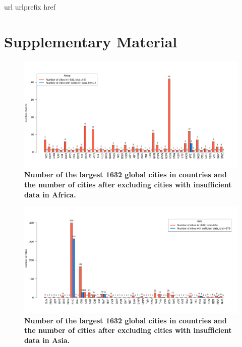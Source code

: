 \documentclass[preprint,12pt]{elsarticle}
\newcommand{\beginsupplement}{%
        \setcounter{table}{0}
        \renewcommand{\thetable}{S\arabic{table}}%
        \setcounter{figure}{0}
        \renewcommand{\thefigure}{S\arabic{figure}}%
     }
\begin{document}

 
%
\begin{thebibliography}{1}
\expandafter\ifx\csname url\endcsname\relax
  \def\url#1{\texttt{#1}}\fi
\expandafter\ifx\csname urlprefix\endcsname\relax\def\urlprefix{URL }\fi
\expandafter\ifx\csname href\endcsname\relax
  \def\href#1#2{#2} \def\path#1{#1}\fi

\end{thebibliography}


\section{Supplementary Material}
\beginsupplement

\begin{figure}
\centering
\includegraphics[trim={ 0 35 25 50 },clip,scale=0.45]{Images/Africa_cities.png}
\caption{\bf Number of the largest 1632 global cities in countries and the number of cities after excluding cities with insufficient data in Africa.}
 \label{fig:africa}
\end{figure}

\begin{figure}
\centering
\includegraphics[trim={ 0 35 25 50 },clip,scale=0.45]{Images/Asia_cities.png}
\caption{\bf Number of the largest 1632 global cities in countries and the number of cities after excluding cities with insufficient data in Asia.}
 \label{fig:asia}
\end{figure}
\end{document}
